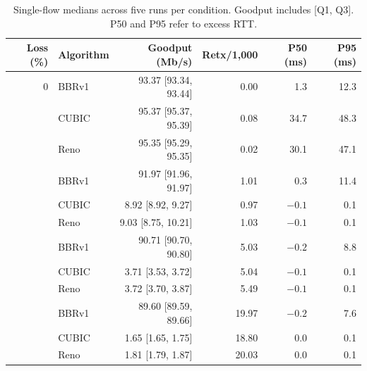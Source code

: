 \begin{table}[!htbp]
\centering
\caption{Single-flow medians across five runs per condition. Goodput includes [Q1, Q3]. P50 and P95 refer to excess RTT.}
\label{tab:loss}
\vspace{4pt}
\begin{tabular}{@{}rlrrrr@{}}
\toprule
Loss (\%) & Algorithm & Goodput (Mb/s) & Retx/1,000 & P50 (ms) & P95 (ms) \\
\midrule
0 & BBRv1 & 93.37 [93.34, 93.44] & 0.00 & 1.3 & 12.3 \\
 & CUBIC & 95.37 [95.37, 95.39] & 0.08 & 34.7 & 48.3 \\
 & Reno & 95.35 [95.29, 95.35] & 0.02 & 30.1 & 47.1 \\
\addlinespace[2pt]
0.1 & BBRv1 & 91.97 [91.96, 91.97] & 1.01 & 0.3 & 11.4 \\
 & CUBIC & 8.92 [8.92, 9.27] & 0.97 & $-0.1$ & 0.1 \\
 & Reno & 9.03 [8.75, 10.21] & 1.03 & $-0.1$ & 0.1 \\
\addlinespace[2pt]
0.5 & BBRv1 & 90.71 [90.70, 90.80] & 5.03 & $-0.2$ & 8.8 \\
 & CUBIC & 3.71 [3.53, 3.72] & 5.04 & $-0.1$ & 0.1 \\
 & Reno & 3.72 [3.70, 3.87] & 5.49 & $-0.1$ & 0.1 \\
\addlinespace[2pt]
2 & BBRv1 & 89.60 [89.59, 89.66] & 19.97 & $-0.2$ & 7.6 \\
 & CUBIC & 1.65 [1.65, 1.75] & 18.80 & 0.0 & 0.1 \\
 & Reno & 1.81 [1.79, 1.87] & 20.03 & 0.0 & 0.1 \\
\bottomrule
\end{tabular}
\end{table}
